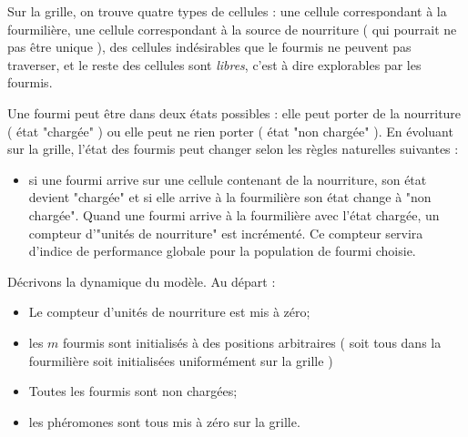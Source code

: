 \documentclass[a4]{article}
\begin{document}
Sur la grille, on trouve quatre types de cellules : une cellule correspondant à la fourmilière, une cellule correspondant à la source de
nourriture ( qui pourrait ne pas être unique ), des cellules indésirables que le fourmis ne peuvent pas traverser, et le reste des
cellules sont \textsl{libres}, c'est à dire explorables par les fourmis.

Une fourmi peut être dans deux états possibles : elle peut porter de la nourriture ( état "chargée" ) ou elle peut ne rien porter ( état "non chargée" ). En évoluant sur la grille, l'état des fourmis peut changer selon les règles naturelles suivantes :
\begin{itemize}
\item si une fourmi arrive sur une cellule contenant de la nourriture, son état devient "chargée" et si elle arrive à la fourmilière son état change à "non chargée". Quand une fourmi arrive à la fourmilière avec l'état chargée, un compteur d'"unités de nourriture" est incrémenté.
Ce compteur servira d'indice de performance globale pour la population de fourmi choisie.
\end{itemize}

Décrivons la dynamique du modèle. Au départ :
\begin{itemize}
\item Le compteur d'unités de nourriture est mis à zéro;
\item les $m$ fourmis sont initialisés à des positions arbitraires ( soit tous dans la fourmilière soit initialisées uniformément sur la grille )
\item Toutes les fourmis sont non chargées;
\item les phéromones sont tous mis à zéro sur la grille.
\end{itemize}
\end{document}
